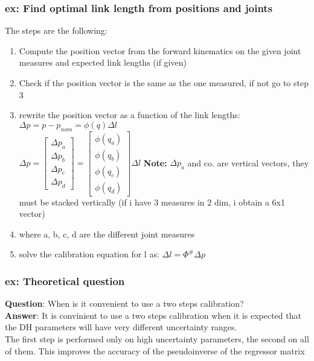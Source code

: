 \documentclass[a4paper,12pt]{article}
\begin{document}
\subsubsection{ex: Find optimal link length from positions and joints}
The steps are the following:
\begin{enumerate}
    \item Compute the position vector from the forward kinematics on the given 
    joint measures and expected link lengths (if given)
    \item Check if the position vector is the same as the one
     measured, if not go to step 3
    \item rewrite the position vector as a function of the link 
    lengths:\\ 
    $\Delta p = p - p_{nom} = \phi(q) \Delta l$ \\
    $\Delta p = \begin{bmatrix}
        \Delta p_a\\
        \Delta p_b \\
        \Delta p_c \\ \Delta p_d
    \end{bmatrix} =
    \begin{bmatrix}
        \phi (q_a)\\
         \phi(q_b) \\
          \phi(q_c) \\ \phi(q_d)
    \end{bmatrix} \Delta l$ 
    \textbf{Note:} $\Delta p_a$ and co. are vertical vectors, they must 
    be stacked vertically (if i have 3 measures in 2 dim, i obtain a 6x1 vector)
    \item where a, b, c, d are the different joint measures 
    \item solve the calibration equation for l as: $\Delta l =  \Phi^{\#} \Delta p$
\end{enumerate}
\subsubsection{ex: Theoretical question}
\textbf{Question}: When is it convenient to use a two steps calibration?\\
\textbf{Answer}: It is convinient to use a two steps calibration when it is expected
 that the DH parameters will have very different uncertainty ranges. \\
 The first step is performed only on high uncertainty parameters, the second on all of them.
 This improves the accuracy of the pseudoinverse of the regressor matrix
\end{document}
